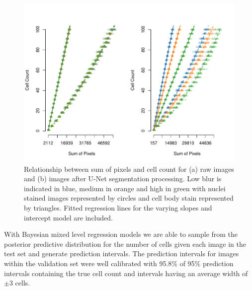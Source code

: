 \documentclass[isoft]{poster_class_UofC}
\begin{document}
\begin{poster}
           \begin{figure}
            \centering
            \captionsetup{type=figure}
            \includegraphics[scale=1.2]{./images/RawVUnet.pdf}
            \caption{Relationship between sum of pixels and cell count for (a) raw images and (b) images after U-Net segmentation processing. Low blur is indicated in blue, medium in orange and high in green with nuclei stained images represented by circles and cell body stain represented by triangles. Fitted regression lines for the varying slopes and intercept model are included.}
            \label{fig:Results}
        \end{figure}   
            \vspace{1cm}
With Bayesian mixed level regression models we are able to sample from the posterior predictive distribution for the number of cells given each image in the test set and generate prediction intervals. The prediction intervals for images within the validation set were well calibrated with 95.8\% of 95\% prediction intervals containing the true cell count and intervals having an average width of $\pm 3$ cells.

           \begin{figure}
           

\end{figure}
\end{poster}
\end{document}
